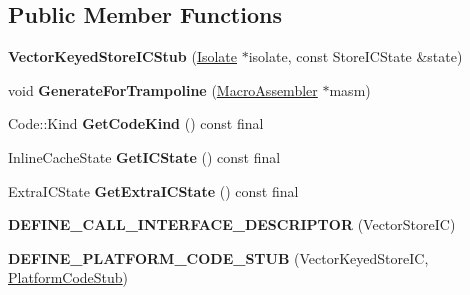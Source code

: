 \subsection*{Public Member Functions}
\begin{DoxyCompactItemize}
\item 
{\bfseries Vector\+Keyed\+Store\+I\+C\+Stub} (\hyperlink{classv8_1_1internal_1_1_isolate}{Isolate} $\ast$isolate, const Store\+I\+C\+State \&state)\hypertarget{classv8_1_1internal_1_1_vector_keyed_store_i_c_stub_a959ce4df46a26cd2c86e167043a5c2a2}{}\label{classv8_1_1internal_1_1_vector_keyed_store_i_c_stub_a959ce4df46a26cd2c86e167043a5c2a2}

\item 
void {\bfseries Generate\+For\+Trampoline} (\hyperlink{classv8_1_1internal_1_1_macro_assembler}{Macro\+Assembler} $\ast$masm)\hypertarget{classv8_1_1internal_1_1_vector_keyed_store_i_c_stub_a22263f0b9b2f3a5b7a7b99fc998a00a1}{}\label{classv8_1_1internal_1_1_vector_keyed_store_i_c_stub_a22263f0b9b2f3a5b7a7b99fc998a00a1}

\item 
Code\+::\+Kind {\bfseries Get\+Code\+Kind} () const  final\hypertarget{classv8_1_1internal_1_1_vector_keyed_store_i_c_stub_a5475d451b9a71a789fb09bdbf494dc1b}{}\label{classv8_1_1internal_1_1_vector_keyed_store_i_c_stub_a5475d451b9a71a789fb09bdbf494dc1b}

\item 
Inline\+Cache\+State {\bfseries Get\+I\+C\+State} () const  final\hypertarget{classv8_1_1internal_1_1_vector_keyed_store_i_c_stub_a712418db1ce70654b1b6ac91bcbf0cb2}{}\label{classv8_1_1internal_1_1_vector_keyed_store_i_c_stub_a712418db1ce70654b1b6ac91bcbf0cb2}

\item 
Extra\+I\+C\+State {\bfseries Get\+Extra\+I\+C\+State} () const  final\hypertarget{classv8_1_1internal_1_1_vector_keyed_store_i_c_stub_afe9c07097cd596e6f9779b8d044bfd33}{}\label{classv8_1_1internal_1_1_vector_keyed_store_i_c_stub_afe9c07097cd596e6f9779b8d044bfd33}

\item 
{\bfseries D\+E\+F\+I\+N\+E\+\_\+\+C\+A\+L\+L\+\_\+\+I\+N\+T\+E\+R\+F\+A\+C\+E\+\_\+\+D\+E\+S\+C\+R\+I\+P\+T\+OR} (Vector\+Store\+IC)\hypertarget{classv8_1_1internal_1_1_vector_keyed_store_i_c_stub_a25331109c3c95bc095f8355011ed856e}{}\label{classv8_1_1internal_1_1_vector_keyed_store_i_c_stub_a25331109c3c95bc095f8355011ed856e}

\item 
{\bfseries D\+E\+F\+I\+N\+E\+\_\+\+P\+L\+A\+T\+F\+O\+R\+M\+\_\+\+C\+O\+D\+E\+\_\+\+S\+T\+UB} (Vector\+Keyed\+Store\+IC, \hyperlink{classv8_1_1internal_1_1_platform_code_stub}{Platform\+Code\+Stub})\hypertarget{classv8_1_1internal_1_1_vector_keyed_store_i_c_stub_a3fbf90805bd3dfc35f424dc3433f77b7}{}\label{classv8_1_1internal_1_1_vector_keyed_store_i_c_stub_a3fbf90805bd3dfc35f424dc3433f77b7}

\end{DoxyCompactItemize}
